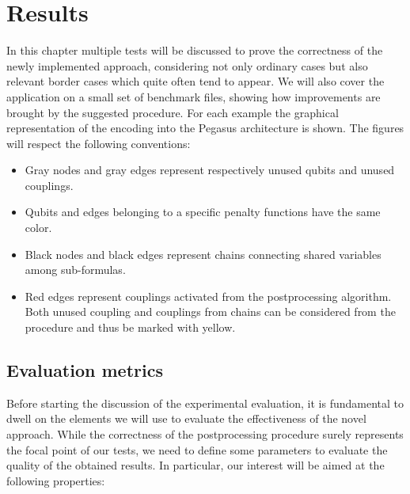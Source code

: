 \chapter{Results}
\label{cha:results}

In this chapter multiple tests will be discussed to prove the correctness of the newly implemented approach, considering not only ordinary cases but also relevant border cases which quite often tend to appear. We will also cover the application on a small set of benchmark files, showing how improvements are brought by the suggested procedure. For each example the graphical representation of the encoding into the Pegasus architecture is shown. The figures will respect the following conventions:

\begin{itemize}
    \item Gray nodes and gray edges represent respectively unused qubits and unused couplings.
    \item Qubits and edges belonging to a specific penalty functions have the same color.
    \item Black nodes and black edges represent chains connecting shared variables among sub-formulas.
    \item Red edges represent couplings activated from the postprocessing algorithm. Both unused coupling and couplings from chains can be considered from the procedure and thus be marked with yellow.
\end{itemize}

\section{Evaluation metrics}

Before starting the discussion of the experimental evaluation, it is fundamental to dwell on the elements we will use to evaluate the effectiveness of the novel approach. While the correctness of the postprocessing procedure surely represents the focal point of our tests, we need to define some parameters to evaluate the quality of the obtained results. In particular, our interest will be aimed at the following properties:

